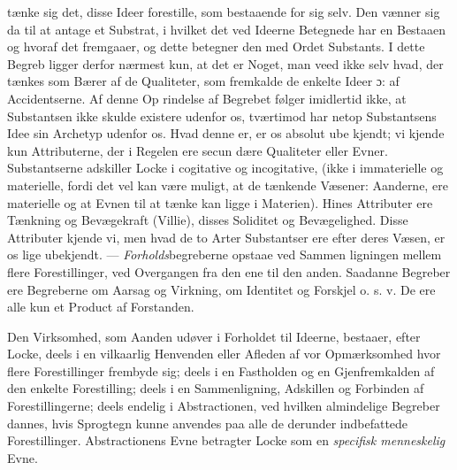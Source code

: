 \documentclass[12pt,a4paper]{book}
\begin{document}
tænke sig det, disse Ideer forestille, som bestaaende for sig
selv. Den vænner sig da til at antage et Substrat, i hvilket
det ved Ideerne Betegnede har en Bestaaen og hvoraf det
fremgaaer, og dette betegner den med Ordet Substants. I dette
Begreb ligger derfor nærmest kun, at det er Noget, man veed
ikke selv hvad, der tænkes som Bærer af de Qualiteter, som
fremkalde de enkelte Ideer ɔ: af Accidentserne. Af denne Op\-%
rindelse af Begrebet følger imidlertid ikke, at Substantsen ikke
skulde existere udenfor os, tværtimod har netop Substantsens
Idee sin Archetyp udenfor os. Hvad denne er, er os absolut ube\-%
kjendt; vi kjende kun Attributerne, der i Regelen ere secun\-%
dære Qualiteter eller Evner. Substantserne adskiller Locke i
cogitative og incogitative, (ikke i immaterielle og materielle,
fordi det vel kan være muligt, at de tænkende Væsener: Aanderne,
ere materielle og at Evnen til at tænke kan ligge i Materien).
Hines Attributer ere Tænkning og Bevægekraft (Villie), disses
Soliditet og Bevægelighed. Disse Attributer kjende vi, men
hvad de to Arter Substantser ere efter deres Væsen, er os
lige ubekjendt. --- \emph{Forholds}begreberne opstaae ved Sammen\-%
ligningen mellem flere Forestillinger, ved Overgangen fra den
ene til den anden. Saadanne Begreber ere Begreberne om
Aarsag og Virkning, om Identitet og Forskjel o. s. v. De ere
alle kun et Product af Forstanden.

Den Virksomhed, som Aanden udøver i Forholdet til
Ideerne, bestaaer, efter Locke, deels i en vilkaarlig Henvenden
eller Afleden af vor Opmærksomhed hvor flere Forestillinger
frembyde sig; deels i en Fastholden og en Gjenfremkalden af
den enkelte Forestilling; deels i en Sammenligning, Adskillen
og Forbinden af Forestillingerne; deels endelig i Abstractionen,
ved hvilken almindelige Begreber dannes, hvis Sprogtegn kunne
anvendes paa alle de derunder indbefattede Forestillinger.
Abstractionens Evne betragter Locke som en \emph{specifisk
menneskelig} Evne.
\end{document}
